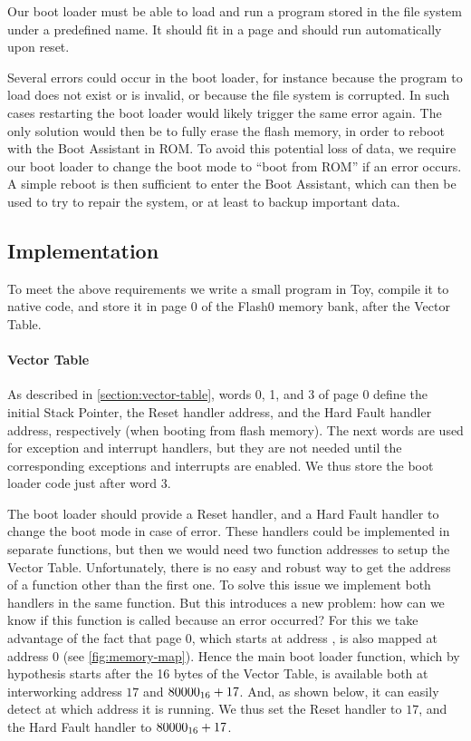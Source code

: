 Our boot loader must be able to load and run a program stored in the file
system under a predefined name. It should fit in a page and should run
automatically upon reset.

Several errors could occur in the boot loader, for instance because the program
to load does not exist or is invalid, or because the file system is corrupted.
In such cases restarting the boot loader would likely trigger the same error
again. The only solution would then be to fully erase the flash memory, in
order to reboot with the Boot Assistant in ROM. To avoid this potential loss of
data, we require our boot loader to change the boot mode to ``boot from ROM''
if an error occurs. A simple reboot is then sufficient to enter the Boot
Assistant, which can then be used to try to repair the system, or at least to
backup important data.

\subsection{Implementation}\label{subsection:boot-loader-impl}

To meet the above requirements we write a small program in Toy, compile it
to native code, and store it in page 0 of the Flash0 memory bank, after the
Vector Table.

\medskip
\paragraph{Vector Table}

As described in \cref{section:vector-table}, words 0, 1, and 3 of page 0 define
the initial Stack Pointer, the Reset handler address, and the Hard Fault
handler address, respectively (when booting from flash memory). The next words
are used for exception and interrupt handlers, but they are not needed until
the corresponding exceptions and interrupts are enabled. We thus store the boot
loader code just after word 3.

The boot loader should provide a Reset handler, and a Hard Fault handler to
change the boot mode in case of error. These handlers could be implemented in
separate functions, but then we would need two function addresses to setup the
Vector Table. Unfortunately, there is no easy and robust way to get the address
of a function other than the first one. To solve this issue we implement both
handlers in the same function. But this introduces a new problem: how can we
know if this function is called because an error occurred? For this we take
advantage of the fact that page 0, which starts at address , is
also mapped at address 0 (see \cref{fig:memory-map}). Hence the main boot
loader function, which by hypothesis starts after the 16 bytes of the Vector
Table, is available both at interworking address $17$ and $80000_{16}+17$.
And, as shown below, it can easily detect at which address it is running. We
thus set the Reset handler to $17$, and the Hard Fault handler to
$80000_{16}+17$.

